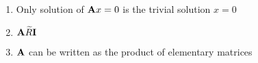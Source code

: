 \documentclass[12pt]{article}
\begin{document}
\begin{itemize}
\begin{enumerate}
\begin{enumerate}
          \item Only solution of $\bold{A}x=0$ is the trivial solution $x=0$

          \item $\bold{A}\widetilde{R}\bold{I}$

          \item $\bold{A}$ can be written as the product of elementary matrices

        \end{enumerate}

    \end{enumerate}

\end{itemize}
\end{document}
